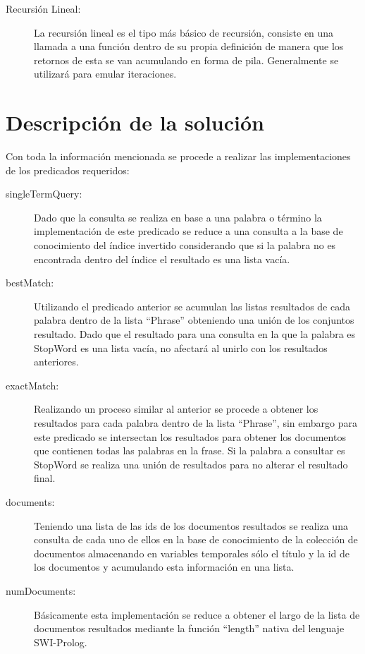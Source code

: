 \documentclass[letterpaper,12pt]{report}
\begin{document}
\begin{description}

    \item [Recursión Lineal:]
        La recursión lineal es el tipo más básico de recursión, consiste en una llamada a una función dentro de su propia definición de manera que los retornos de esta se van acumulando en forma de pila. Generalmente se utilizará para emular iteraciones.

\end{description}

\vspace {3cm}

\section {Descripción de la solución}

Con toda la información mencionada se procede a realizar las implementaciones de los predicados requeridos:

\begin{description}

    \item [singleTermQuery:]
        Dado que la consulta se realiza en base a una palabra o término la implementación de este predicado se reduce a una consulta a la base de conocimiento del índice invertido considerando que si la palabra no es encontrada dentro del índice el resultado es una lista vacía.

    \item [bestMatch:]
        Utilizando el predicado anterior se acumulan las listas resultados de cada palabra dentro de la lista ``Phrase'' obteniendo una unión de los conjuntos resultado. Dado que el resultado para una consulta en la que la palabra es StopWord es una lista vacía, no afectará al unirlo con los resultados anteriores.

    \item [exactMatch:]
        Realizando un proceso similar al anterior se procede a obtener los resultados para cada palabra dentro de la lista ``Phrase'', sin embargo para este predicado se intersectan los resultados para obtener los documentos que contienen todas las palabras en la frase. Si la palabra a consultar es StopWord se realiza una unión de resultados para no alterar el resultado final.

    \item [documents:]
        Teniendo una lista de las ids de los documentos resultados se realiza una consulta de cada uno de ellos en la base de conocimiento de la colección de documentos almacenando en variables temporales sólo el título y la id de los documentos y acumulando esta información en una lista.

    \item [numDocuments:]
        Básicamente esta implementación se reduce a obtener el largo de la lista de documentos resultados mediante la función ``length'' nativa del lenguaje SWI-Prolog.

\end{description} 
\end{document}
